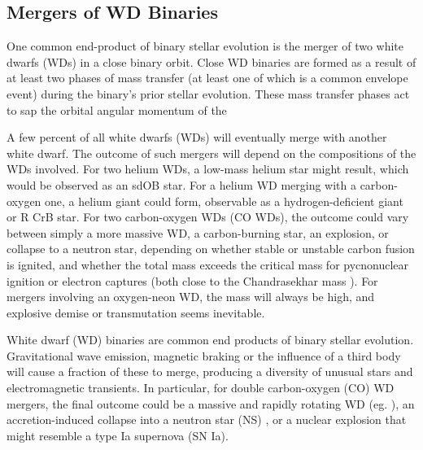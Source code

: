 \subsection{Mergers of WD Binaries}
\label{ssec:wdmergers_sub}

One common end-product of binary stellar evolution is the merger of two white dwarfs (WDs) in a close binary orbit.  Close WD binaries are formed as a result of at least two phases of mass transfer (at least one of which is a common envelope event) during the binary's prior stellar evolution.  These mass transfer phases act to sap the orbital angular momentum of the 


A few percent of all white dwarfs (WDs) will eventually merge with another white dwarf.  The outcome of such mergers will depend on the compositions of the WDs involved.  For two helium WDs, a low-mass helium star might result, which would be observed as an sdOB star.  For a helium WD merging with a carbon-oxygen one, a helium giant could form, observable as a hydrogen-deficient giant or R CrB star.  For two carbon-oxygen WDs (CO WDs), the outcome could vary between simply a more massive WD, a carbon-burning star, an explosion, or collapse to a neutron star, depending on whether stable or unstable carbon fusion is ignited, and whether the total mass exceeds the critical mass for pycnonuclear ignition or electron captures (both close to the Chandrasekhar mass \Mch).  For mergers involving an oxygen-neon WD, the mass will always be high, and explosive demise or transmutation seems inevitable.

White dwarf (WD) binaries are common end products of binary stellar evolution.  Gravitational wave emission, magnetic braking or the influence of a third body will cause a fraction of these to merge, producing a diversity of unusual stars and electromagnetic transients.  In particular, for double carbon-oxygen (CO) WD mergers, the final outcome could be a massive and rapidly rotating WD (eg. \citealt{segrcm97}), an accretion-induced collapse into a neutron star (NS) \citep{saion85}, or a nuclear explosion that might resemble a type Ia supernova (SN Ia).
